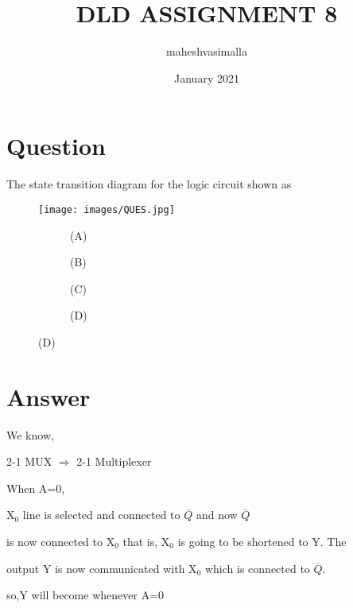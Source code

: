 \documentclass[standalone]{article}
\title{ DLD ASSIGNMENT 8}
\author{maheshvasimalla }
\date{January 2021}
\begin{document}
\maketitle

\section{Question}
       The state transition diagram for the logic circuit shown as
\begin{figure}[h]
    \centering
    \texttt{[image: images/QUES.jpg]}
\end{figure}
 
\begin{figure}[H]
    \centering
    \begin{subfigure}[h]{0.4\textwidth}
        \scalebox{0.7}{ }
        \caption{(A)}
    \end{subfigure}
    \hfill
    \begin{subfigure}[h]{0.4\textwidth}
        \scalebox{0.7}{ }
        \caption{(B)}
    \end{subfigure}
    \hfill
    \begin{subfigure}[h]{0.4\textwidth}
        \scalebox{0.7}{ }
        \caption{(C)}
    \end{subfigure}
    \hfill    
     \begin{subfigure}[h]{0.4\textwidth}
        \scalebox{0.7}{ }
        \caption{(D)}
    \end{subfigure}
\end{figure}

\section{ Answer}

    We know,
  
  2-1 MUX $\Longrightarrow$ 2-1 Multiplexer
  
  When   A=0,
  
  X$_0$   line  is  selected  and  connected  to $\overline{Q}$  and now  $\overline{Q}$
 
 is  now  connected  to  X$_0$  that  is,  X$_0$  is  going  to  be   shortened to  Y.  The
 
 output  Y  is  now  communicated  with  X$_0$  which  is  connected  to $\overline{Q}$.
  
  so,Y will become  whenever A=0
  
\end{document}
